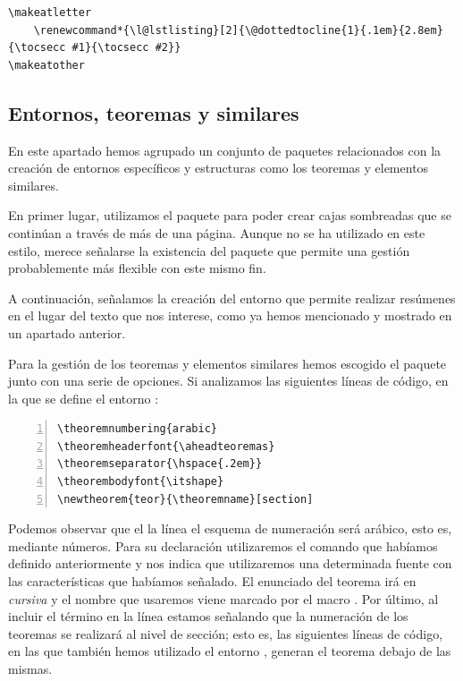 \begin{lstlisting}[frame=none]
\makeatletter
	\renewcommand*{\l@lstlisting}[2]{\@dottedtocline{1}{.1em}{2.8em}{\tocsecc #1}{\tocsecc #2}}
\makeatother
\end{lstlisting}

\subsection{Entornos, teoremas y similares}
En este apartado hemos agrupado un conjunto de paquetes relacionados con la creación de entornos específicos y estructuras como los teoremas y elementos similares.

En primer lugar, utilizamos el paquete  para poder crear cajas sombreadas que se continúan a través de más de una página. Aunque no se ha utilizado en este estilo, merece señalarse la existencia del paquete  que permite una gestión probablemente más flexible con este mismo fin.

A continuación, señalamos la creación del entorno  que permite realizar resúmenes en el lugar del texto que nos interese, como ya hemos mencionado y mostrado en un apartado anterior.

Para la gestión de los teoremas y elementos similares hemos escogido el paquete  junto con una serie de opciones. Si analizamos las siguientes líneas de código, en la que se define el entorno :

\begin{lstlisting}[frame=none, numbers=left, xleftmargin=2em]
\theoremnumbering{arabic}
\theoremheaderfont{\aheadteoremas}
\theoremseparator{\hspace{.2em}}
\theorembodyfont{\itshape}
\newtheorem{teor}{\theoremname}[section]
\end{lstlisting}

Podemos observar que el la línea  el esquema de numeración será arábico, esto es, mediante números. Para su declaración utilizaremos el comando  que habíamos definido anteriormente y nos indica que utilizaremos una determinada fuente con las características que habíamos señalado. El enunciado del teorema irá en \emph{cursiva} y el nombre que usaremos viene marcado por el macro  . Por último, al incluir el término  en la línea  estamos señalando que la numeración de los teoremas se realizará al nivel de sección; esto es, las siguientes líneas de código, en las que también hemos utilizado el entorno , generan el teorema debajo de las mismas.

